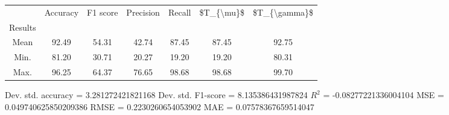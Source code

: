 \begin{tabular}{|c|c|c|c|c|c|c|}
\toprule
{} &  Accuracy &  F1 score &  Precision &  Recall &  \$T\_\{\textbackslash mu\}\$ &  \$T\_\{\textbackslash gamma\}\$ \\
Results &           &           &            &         &            &               \\
\hline
Mean    &     92.49 &     54.31 &      42.74 &   87.45 &      87.45 &         92.75 \\
Min.    &     81.20 &     30.71 &      20.27 &   19.20 &      19.20 &         80.31 \\
Max.    &     96.25 &     64.37 &      76.65 &   98.68 &      98.68 &         99.70 \\
\bottomrule
\end{tabular}

 Dev. std. accuracy = 3.281272421821168
 Dev. std. F1-score = 8.135386431987824
 $R^2$ = -0.08277221336004104
 MSE = 0.049740625850209386
 RMSE = 0.2230260654053902
 MAE = 0.07578367659514047